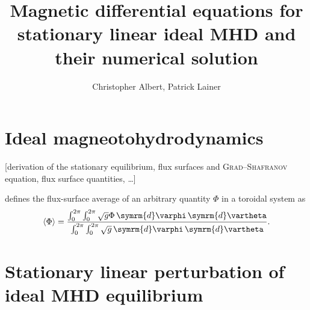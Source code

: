 \documentclass[a4paper, twoside, 10pt, english]{article}
\title{Magnetic differential equations for stationary linear ideal MHD and their numerical solution}
\author{Christopher Albert, Patrick Lainer}
\numberwithin{equation}{section}
\let\temp\varrho
\let\varrho\rho
\let\rho\temp
\let\temp\vartheta
\let\vartheta\theta
\let\theta\temp
\let\temp\varphi
\let\varphi\phi
\let\phi\temp
\newcommand*\diff{\ensuremath{\symrm{d}}}  %
\begin{document}
\maketitle
\tableofcontents

\newpage
\section{Ideal magneotohydrodynamics}

[derivation of the stationary equilibrium, flux surfaces and \textsc{Grad}--\textsc{Shafranov} equation, flux surface quantities, \ldots]

\textcite{dHaeseleer91} defines the flux-surface average of an arbitrary quantity $\Phi$ in a toroidal system as
\begin{gather}
  \langle \Phi \rangle = \frac{\int_{0}^{2 \pi} \int_{0}^{2 \pi} \sqrt{g} \Phi \, \diff \phi \, \diff \theta}{\int_{0}^{2 \pi} \int_{0}^{2 \pi} \sqrt{g} \, \diff \phi \, \diff \theta}. \label{eq:flux_surface_avg}
\end{gather}

\section{Stationary linear perturbation of ideal MHD equilibrium}
\end{document}
